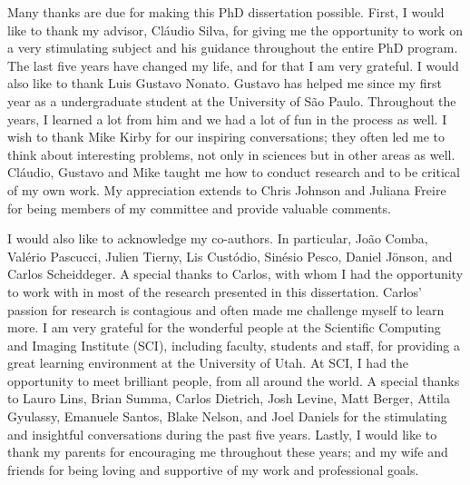 
Many thanks are due for making this PhD dissertation possible. 
%
First, I would like to thank my advisor, Cl\'audio Silva, for giving me the opportunity to work on a very stimulating subject and his guidance throughout the entire PhD program. The last five years have changed my life, and for that I am very grateful.
%
I would also like to thank Luis Gustavo Nonato. Gustavo has helped me since my first year as a undergraduate student at the University of S\~ao Paulo. Throughout the years, I learned a lot from him and we had a lot of fun in the process as well.
%
I wish to thank Mike Kirby for our inspiring conversations; they often led me to think about interesting problems, not only in sciences but in other areas as well. 
%
Cl\'audio, Gustavo and Mike taught me how to conduct research and to be critical of my own work.  
%
My appreciation extends to Chris Johnson and Juliana Freire for being members of my committee and provide valuable comments. 

I would also like to acknowledge my co-authors. In particular, Jo\~ao Comba, Val\'erio Pascucci, Julien Tierny,  Lis Cust\'odio, Sin\'esio Pesco, Daniel J\"onson, and  Carlos Scheiddeger. A special thanks to Carlos, with whom I had the opportunity to work with in most of the research presented in this dissertation. Carlos' passion for research is contagious and often made me challenge myself to learn more.
%
I am very grateful for the wonderful people at the Scientific Computing and Imaging Institute (SCI), including faculty, students and staff,  for providing a great learning environment at the University of Utah. 
%
At SCI, I had the opportunity to meet brilliant people, from all around the world.
%
A special thanks to Lauro Lins, Brian Summa, Carlos Dietrich, Josh Levine, Matt Berger, Attila Gyulassy, Emanuele Santos, Blake Nelson, and Joel Daniels for the stimulating and insightful conversations during the past five years.
%
Lastly, I would like to thank my parents for encouraging me throughout these years; and my wife and friends for being loving and supportive of my work and professional goals.